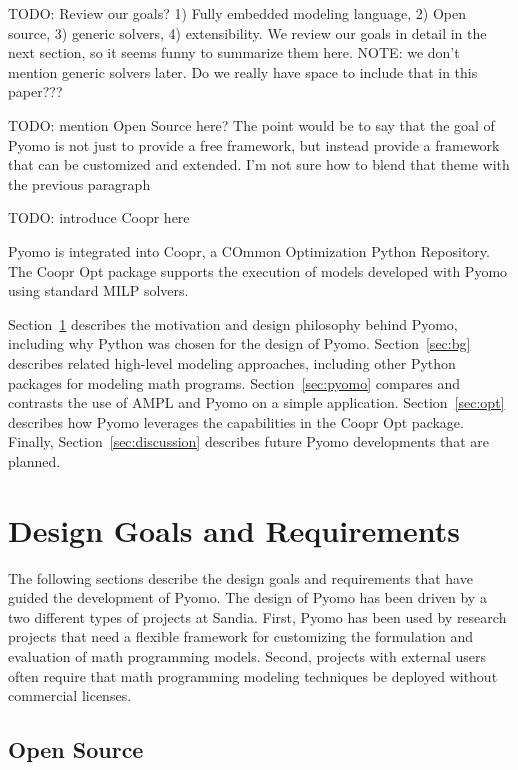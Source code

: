TODO: Review our goals?  1) Fully embedded modeling language, 2) Open source, 3) generic solvers, 4) extensibility.  We review our goals in detail in the next section, so it seems funny to summarize them here.  NOTE: we don't mention generic solvers later.  Do we really have space to include that in this paper???

TODO: mention Open Source here?  The point would be to say that the goal of Pyomo is not just
to provide a free framework, but instead provide a framework that can be customized and extended.  I'm not sure how to blend that theme with the previous paragraph

TODO: introduce Coopr here

Pyomo is integrated into Coopr, a COmmon Optimization
Python Repository. The Coopr Opt package supports the execution of models
developed with Pyomo using standard MILP solvers.


Section~\ref{sec:design} describes the motivation and design philosophy
behind Pyomo, including why Python was chosen for the design of
Pyomo.  Section~\ref{sec:bg} describes related high-level modeling
approaches, including other Python packages for modeling math programs.
Section~\ref{sec:pyomo} compares and contrasts the use of AMPL and
Pyomo on a simple application.  Section~\ref{sec:opt} describes how
Pyomo leverages the capabilities in the Coopr Opt package.  Finally,
Section~\ref{sec:discussion} describes future Pyomo developments that
are planned.
\fi


\section{Design Goals and Requirements}
\label{sec:design}

The following sections describe the design goals and requirements that
have guided the development of Pyomo.  The design of Pyomo has been driven
by a two different types of projects at Sandia.  First, Pyomo has been
used by research projects that need a flexible framework for customizing
the formulation and evaluation of math programming models.  Second,
projects with external users often require that math programming modeling
techniques be deployed without commercial licenses.

\subsection{Open Source}

